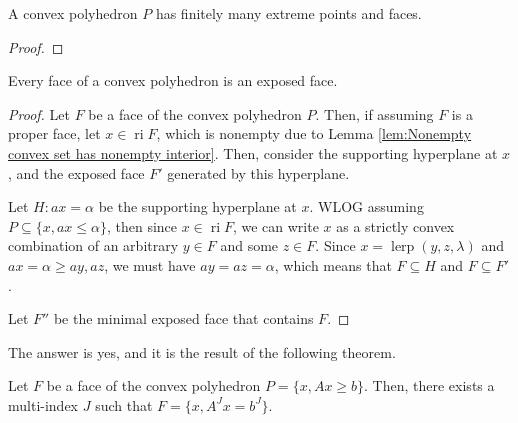 \begin{theorem}
\label{thr:Finiteness of faces in convex polyhedra}
  A convex polyhedron \( P \) has finitely many extreme points and faces.
\end{theorem}

\begin{proof}
  
\end{proof}

\begin{theorem}
\label{thr:Faces and exposed faces in convex polyhedra}
  Every face of a convex polyhedron is an exposed face.
\end{theorem}

\begin{proof}
  Let \( F \) be a face of the convex polyhedron \( P \). Then, if assuming \( F
  \) is a proper face, let \( x \in \operatorname{ri} F \), which is nonempty
  due to Lemma \ref{lem:Nonempty convex set has nonempty interior}. Then,
  consider the supporting hyperplane at \( x \), and the exposed face \( F' \)
  generated by this hyperplane.

  Let \( H: ax = \alpha \) be the supporting hyperplane at \( x \). WLOG
  assuming \( P \subseteq \{x, ax \le  \alpha\}   \), then since \( x \in
  \operatorname{ri} F \), we can write \( x \) as a strictly convex combination
  of an arbitrary \( y \in F \) and some \( z \in F \). Since \( x =
  \operatorname{lerp}(y, z, \lambda) \) and \( ax = \alpha \ge  ay, az \), we
  must have \( ay = az = \alpha \), which means that \( F \subseteq H \) and \(
  F \subseteq F'\).

  Let \( F'' \) be the minimal exposed face that contains \( F \).



\end{proof}

The answer is yes, and it is the result of the following theorem.

\begin{theorem}
\label{thr:Face representation theorem}
  Let \( F \) be a face of the convex polyhedron \( P = \{x, Ax \ge  b\}   \). Then,
  there exists a multi-index \( J \) such that \( F = \{x, A^{J}x = b^{J}\}
  \).
\end{theorem}

